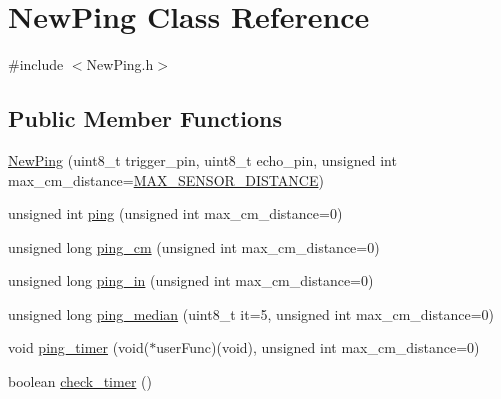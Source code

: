 \hypertarget{class_new_ping}{}\section{New\+Ping Class Reference}
\label{class_new_ping}


{\ttfamily \#include $<$New\+Ping.\+h$>$}

\subsection*{Public Member Functions}
\begin{DoxyCompactItemize}
\item 
\mbox{\hyperlink{class_new_ping_ad517c7800c66b0a9f3c175d881776aff}{New\+Ping}} (uint8\+\_\+t trigger\+\_\+pin, uint8\+\_\+t echo\+\_\+pin, unsigned int max\+\_\+cm\+\_\+distance=\mbox{\hyperlink{_new_ping_8h_a066008eaba26c8638c448b56bc6e1ea4}{M\+A\+X\+\_\+\+S\+E\+N\+S\+O\+R\+\_\+\+D\+I\+S\+T\+A\+N\+CE}})
\item 
unsigned int \mbox{\hyperlink{class_new_ping_ad674a1301a81b5bb18bde45854a716c3}{ping}} (unsigned int max\+\_\+cm\+\_\+distance=0)
\item 
unsigned long \mbox{\hyperlink{class_new_ping_ac160903f4a9aebe5967204d444acd525}{ping\+\_\+cm}} (unsigned int max\+\_\+cm\+\_\+distance=0)
\item 
unsigned long \mbox{\hyperlink{class_new_ping_a5ef06daa20cd318bc049b2d7b5fd4c80}{ping\+\_\+in}} (unsigned int max\+\_\+cm\+\_\+distance=0)
\item 
unsigned long \mbox{\hyperlink{class_new_ping_afd21db530da5856049d7f9684b448935}{ping\+\_\+median}} (uint8\+\_\+t it=5, unsigned int max\+\_\+cm\+\_\+distance=0)
\item 
void \mbox{\hyperlink{class_new_ping_a5b80f92a7885f82640a0b096c2d3c85e}{ping\+\_\+timer}} (void($\ast$user\+Func)(void), unsigned int max\+\_\+cm\+\_\+distance=0)
\item 
boolean \mbox{\hyperlink{class_new_ping_a225128afccd4bb37f137669bb1064cbd}{check\+\_\+timer}} ()
\end{DoxyCompactItemize}

